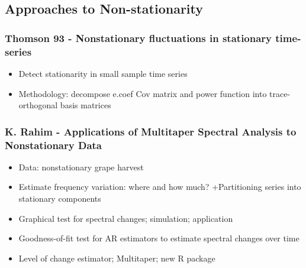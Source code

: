 \documentclass{article}
\begin{document}
\subsection{Approaches to Non-stationarity}

\subsubsection{Thomson 93 - Nonstationary fluctuations in stationary time-series}
\begin{itemize}
    \item Detect stationarity in small sample time series
    \item  Methodology: decompose e.coef Cov matrix and power function into trace-orthogonal basis matrices
\end{itemize}

\subsubsection{K. Rahim - Applications of Multitaper Spectral Analysis to Nonstationary Data}
\begin{itemize}
    \item Data: nonstationary grape harvest
    \item Estimate frequency variation: where and how much? +Partitioning series into stationary components
    \item Graphical test for spectral changes; simulation; application
    \item Goodness-of-fit test for AR estimators to estimate spectral changes over time
    \item Level of change estimator; Multitaper; new R package
\end{itemize}
\end{document}
